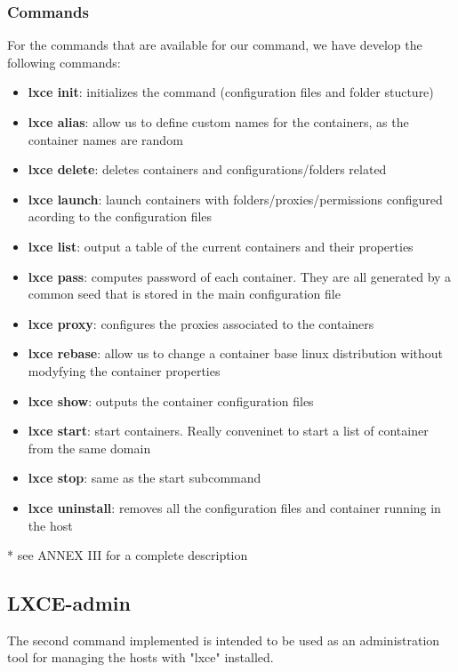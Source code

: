 \subsubsection{Commands}
For the commands that are available for our command, we have develop the following commands:
\begin{itemize}
	\item{\textbf{lxce init}: initializes the command (configuration files and folder stucture)                         }
	\item{\textbf{lxce alias}: allow us to define custom names for the containers, as the container names are random}
	\item{\textbf{lxce delete}: deletes containers and configurations/folders related}
	\item{\textbf{lxce launch}: launch containers with folders/proxies/permissions configured acording to the configuration files                               }
	\item{\textbf{lxce list}: output a table of the current containers and their properties}
	\item{\textbf{lxce pass}: computes password of each container. They are all generated by a common seed that is stored in the main configuration file}
	\item{\textbf{lxce proxy}: configures the proxies associated to the containers }
	\item{\textbf{lxce rebase}: allow us to change a container base linux distribution without modyfying the container properties}
	\item{\textbf{lxce show}: outputs the container configuration files }
	\item{\textbf{lxce start}: start containers. Really conveninet to start a list of container from the same domain}
	\item{\textbf{lxce stop}: same as the start subcommand                                 }
	\item{\textbf{lxce uninstall}: removes all the configuration files and container running in the host }
\end{itemize}
* see ANNEX III for a complete description

\newpage
\subsection{LXCE-admin}
The second command implemented is intended to be used as an administration tool for managing the hosts with "lxce" installed.  


